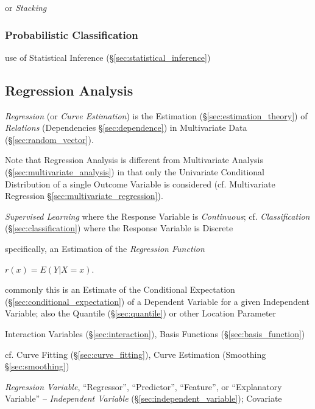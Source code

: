 or \emph{Stacking}



\subsubsection{Probabilistic Classification}
\label{sec:probabilistic_classification}

use of Statistical Inference (\S\ref{sec:statistical_inference})



\subsection{Regression Analysis}\label{sec:regression_analysis}

\emph{Regression} (or \emph{Curve Estimation}) is the Estimation
(\S\ref{sec:estimation_theory}) of \emph{Relations} (Dependencies
\S\ref{sec:dependence}) in Multivariate Data (\S\ref{sec:random_vector}).

Note that Regression Analysis is different from Multivariate Analysis
(\S\ref{sec:multivariate_analysis}) in that only the Univariate Conditional
Distribution of a single Outcome Variable is considered (cf. Multivariate
Regression \S\ref{sec:multivariate_regression}).

\emph{Supervised Learning} where the Response Variable is \emph{Continuous}; cf.
\emph{Classification} (\S\ref{sec:classification}) where the Response Variable
is Discrete

specifically, an Estimation of the \emph{Regression Function}

$r(x) = E(Y | X = x)$.

commonly this is an Estimate of the Conditional Expectation
(\S\ref{sec:conditional_expectation}) of a Dependent Variable for a given
Independent Variable; also the Quantile (\S\ref{sec:quantile}) or other Location
Parameter

Interaction Variables (\S\ref{sec:interaction}), Basis Functions
(\S\ref{sec:basis_function})

\fist cf. Curve Fitting (\S\ref{sec:curve_fitting}), Curve Estimation (Smoothing
\S\ref{sec:smoothing})

\emph{Regression Variable}, ``Regressor'', ``Predictor'', ``Feature'', or
``Explanatory Variable'' -- \emph{Independent Variable}
(\S\ref{sec:independent_variable}); Covariate

